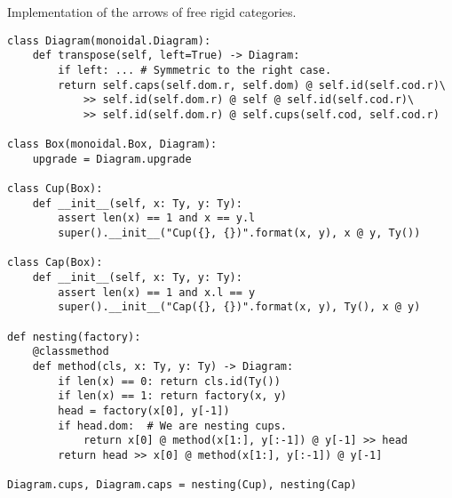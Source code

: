 \begin{python}
{\normalfont Implementation of the arrows of free rigid categories.}

\begin{verbatim}
class Diagram(monoidal.Diagram):
    def transpose(self, left=True) -> Diagram:
        if left: ... # Symmetric to the right case.
        return self.caps(self.dom.r, self.dom) @ self.id(self.cod.r)\
            >> self.id(self.dom.r) @ self @ self.id(self.cod.r)\
            >> self.id(self.dom.r) @ self.cups(self.cod, self.cod.r)

class Box(monoidal.Box, Diagram):
    upgrade = Diagram.upgrade

class Cup(Box):
    def __init__(self, x: Ty, y: Ty):
        assert len(x) == 1 and x == y.l
        super().__init__("Cup({}, {})".format(x, y), x @ y, Ty())

class Cap(Box):
    def __init__(self, x: Ty, y: Ty):
        assert len(x) == 1 and x.l == y
        super().__init__("Cap({}, {})".format(x, y), Ty(), x @ y)

def nesting(factory):
    @classmethod
    def method(cls, x: Ty, y: Ty) -> Diagram:
        if len(x) == 0: return cls.id(Ty())
        if len(x) == 1: return factory(x, y)
        head = factory(x[0], y[-1])
        if head.dom:  # We are nesting cups.
            return x[0] @ method(x[1:], y[:-1]) @ y[-1] >> head
        return head >> x[0] @ method(x[1:], y[:-1]) @ y[-1]

Diagram.cups, Diagram.caps = nesting(Cup), nesting(Cap)
\end{verbatim}
\end{python}

